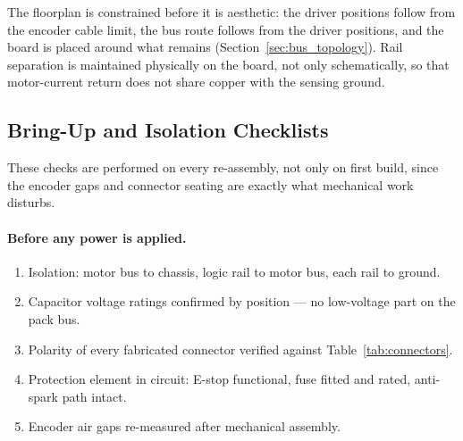 
The floorplan is constrained before it is aesthetic: the driver positions follow
from the encoder cable limit, the bus route follows from the driver positions,
and the board is placed around what remains
(Section~\ref{sec:bus_topology}). Rail separation is maintained physically on
the board, not only schematically, so that motor-current return does not share
copper with the sensing ground.

\subsection{Bring-Up and Isolation Checklists}
\label{app:checklists}

These checks are performed on every re-assembly, not only on first build, since
the encoder gaps and connector seating are exactly what mechanical work
disturbs.

\paragraph{Before any power is applied.}
\begin{enumerate}
  \item Isolation: motor bus to chassis, logic rail to motor bus, each rail to
        ground.
  \item Capacitor voltage ratings confirmed by position --- no low-voltage part
        on the pack bus.
  \item Polarity of every fabricated connector verified against
        Table~\ref{tab:connectors}.
  \item Protection element in circuit: E-stop functional, fuse fitted and rated,
        anti-spark path intact.
  \item Encoder air gaps re-measured after mechanical assembly.
\end{enumerate}

